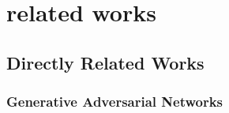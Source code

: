\documentclass[journal]{IEEEtran}
\begin{document}



\section{related works}

\subsection{Directly Related Works}
\subsubsection{Generative Adversarial Networks}
\end{document}
